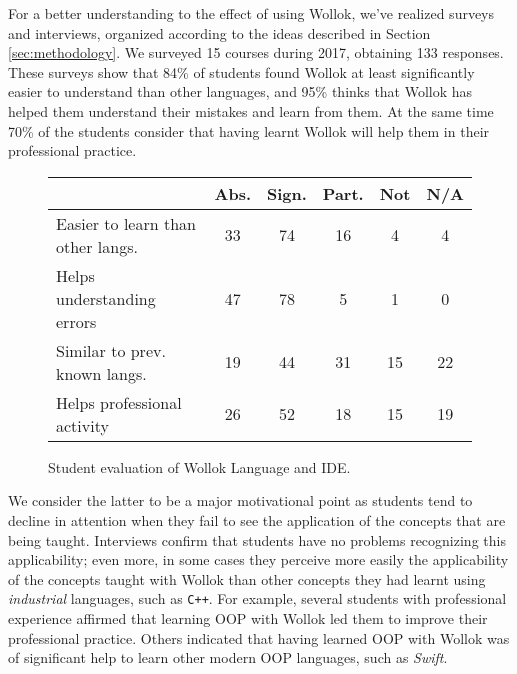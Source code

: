 \medskip
For a better understanding to the effect of using Wollok, we've realized surveys and interviews, organized according to the ideas described in Section \ref{sec:methodology}.
We surveyed 15 courses during 2017, obtaining 133 responses.
These surveys show that 84\% of students found Wollok at least significantly easier to understand than other languages,
and 95\% thinks that Wollok has helped them understand their mistakes and learn from them.
At the same time 70\% of the students consider that having learnt Wollok will help them in their professional practice.

\begin{figure}[ht]
 \centering
 \footnotesize
 \begin{tabular}{|p{13em}|c|c|c|c|c|}
 	\hline
 	& Abs. & Sign. & Part. & Not & N/A \\
 	\hline
 	Easier to learn than other langs. & 33 & 74 & 16 & 4 & 4 \\
 	Helps understanding errors & 47 & 78 & 5 & 1 & 0 \\
 	Similar to prev. known langs. & 19 & 44 & 31 & 15 & 22 \\
 	Helps professional activity & 26 & 52 & 18 & 15 & 19 \\
 	\hline
 
 \end{tabular}

 \caption{\small Student evaluation of Wollok Language and IDE.}
\label{fig:helloWorld/wollok}
\end{figure}

We consider the latter to be a major motivational point
as students tend to decline in attention 
when they fail to see the application of the concepts that are being taught.
Interviews confirm that students have no problems recognizing this applicability;
even more, in some cases they perceive more easily the applicability of the concepts taught with Wollok 
than other concepts they had learnt using \emph{industrial} languages, such as \texttt{C++}.
For example, several students with professional experience affirmed that 
learning OOP with Wollok led them to improve their professional practice.
Others indicated that having learned OOP with Wollok was of significant help 
to learn other modern OOP languages, such as \emph{Swift}.

